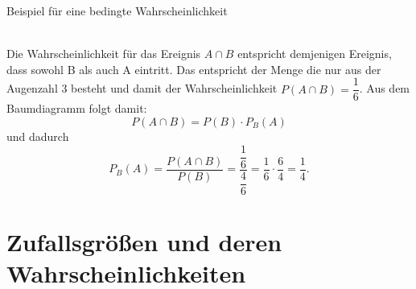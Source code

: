 \begin{bsp}{Beispiel für eine bedingte Wahrscheinlichkeit}{}
{}\\
Die Wahrscheinlichkeit für das Ereignis $A\cap B$ entspricht demjenigen Ereignis, dass sowohl B als auch A eintritt. Das entspricht der Menge die nur aus der Augenzahl 3 besteht und damit der Wahrscheinlichkeit $P(A\cap B) = \dfrac{1}{6}$. Aus dem Baumdiagramm folgt damit: $$P(A\cap B) = P(B) \cdot P_{B}(A)$$ und dadurch $$P_{B}(A) = \dfrac{P(A\cap B)}{P(B)} = \dfrac{\dfrac{1}{6}}{\dfrac{4}{6}}= \dfrac{1}{6} \cdot \dfrac{6}{4} = \dfrac{1}{4}. $$
\end{bsp}
\section{Zufallsgrößen und deren Wahrscheinlichkeiten}
